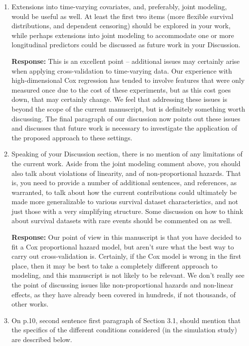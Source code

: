\documentclass[12]{article}
\newcommand{\re}{\textbf{Response: }}
\begin{document}
\begin{enumerate}[align = left]
\item Extensions into time-varying covariates, and, preferably, joint modeling, would be useful as well. At least the first two items (more flexible survival distributions, and dependent censoring) should be explored in your work, while perhaps extensions into joint modeling to accommodate one or more longitudinal predictors could be discussed as future work in your Discussion.
        
\re This is an excellent point -- additional issues may certainly arise when applying cross-validation to time-varying data. Our experience with high-dimensional Cox regression has tended to involve features that were only measured once due to the cost of these experiments, but as this cost goes down, that may certainly change. We feel that addressing these issues is beyond the scope of the current manuscript, but is definitely something worth discussing. The final paragraph of our discussion now points out these issues and discusses that future work is necessary to investigate the application of the proposed approach to these settings.

\item \label{limitations} Speaking of your Discussion section, there is no mention of any limitations of the current work. Aside from the joint modeling comment above, you should also talk about violations of linearity, and of non-proportional hazards. That is, you need to provide a number of additional sentences, and references, as warranted, to talk about how the current contributions could ultimately be made more generalizable to various survival dataset characteristics, and not just those with a very simplifying structure. Some discussion on how to think about survival datasets with rare events should be commented on as well.

  \re Our point of view in this manuscript is that you have decided to fit a Cox proportional hazard model, but aren't sure what the best way to carry out cross-validation is. Certainly, if the Cox model is wrong in the first place, then it may be best to take a completely different approach to modeling, and this manuscript is not likely to be relevant. We don't really see the point of discussing issues like non-proportional hazards and non-linear effects, as they have already been covered in hundreds, if not thousands, of other works.

\item On p.10, second sentence first paragraph of Section 3.1, should mention that the specifics of the different conditions considered (in the simulation study) are described below.


\end{enumerate}
\end{document}
